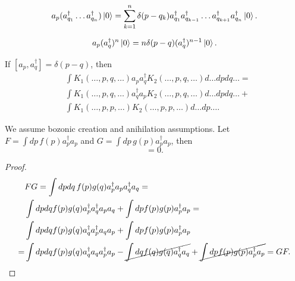 \documentclass[main.tex]{subfiles}
\begin{document}
\begin{corollary}
\begin{equation}
a_p (a_{q_1}^\dagger \dots a_{q_n}^\dagger) \ket{0} = \sum_{k=1}^n\delta(p - q_k) a_{q_1}^\dagger a_{q_{k - 1}}^\dagger \dots a_{q_{k + 1}}^\dagger a_{q_n}^\dagger \ket{0}.
\end{equation}
\end{corollary}

\begin{corollary}
\begin{equation}
a_p (a_{q}^\dagger)^n \ket{0} = n \delta(p - q) (a_{q}^\dagger)^{n-1} \ket{0}.
\end{equation}
\end{corollary}

\begin{lemma}
If $[a_p, a^\dagger_q] = \delta(p - q)$, then
\begin{align*}
&\int K_1(\dots, p, q, \dots) a_p a^\dagger_q K_2(\dots, p, q, \dots) d \dots dpdq \ldots = \\
&\int K_1(\dots, p, q, \dots) a^\dagger_q a_p K_2(\dots, p, q, \dots) d \dots dpdq \ldots + \\ 
&\int K_1(\dots, p, p, \dots)K_2(\dots, p,p, \dots)d \dots dp \dots.
\end{align*}
\end{lemma}

\begin{proposition} We assume bozonic creation and anihilation assumptions.
Let $F = \int dp\, f(p)a^\dagger_p a_p$ and $G = \int dp\, g(p)a^\dagger_p a_p$, then
\begin{equation}
[F, G] = 0.
\end{equation} 
\end{proposition}
\begin{proof}
\begin{align*}
&FG = \int dp dq \,f(p)g(q) a^\dagger_p a_p a^\dagger_q a_q = \\
& \int dp dq f(p)g(q) a^\dagger_p  a^\dagger_q a_p a_q + \int dp f(p)g(p) a^\dagger_p a_p =  \\
& \int dp dq f(p)g(q) a^\dagger_q a^\dagger_p  a_q  a_p  + \int dp f(p)g(p) a^\dagger_p a_p \\ =
& \int dp dq f(p)g(q) a^\dagger_q a_q a^\dagger_p   a_p - \cancel{\int dq f(q)g(q) a^\dagger_q    a_q}  + \cancel{\int dp f(p)g(p) a^\dagger_p a_p} 
= GF. \\ 
\end{align*}
\end{proof}
\end{document}
